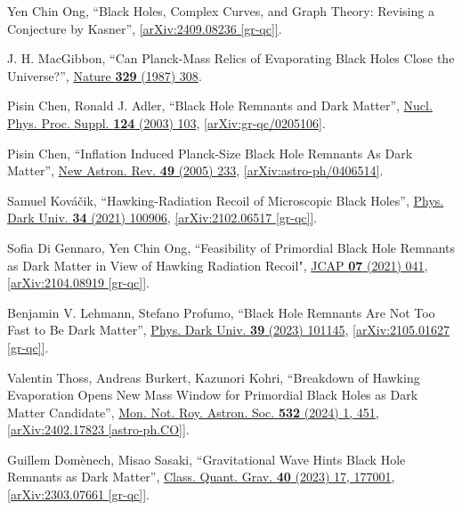 \documentclass[preprintnumbers, floatfix, preprintnumbers, letterpaper, twocolumn, superscriptaddress,nofootinbib]{revtex4-2}
\begin{document}
\begin{thebibliography}{99}
Yen Chin Ong, ``Black Holes, Complex Curves, and Graph Theory: Revising a Conjecture by Kasner'', \href{https://arxiv.org/abs/2409.08236}{[arXiv:2409.08236 [gr-qc]]}.

J. H. MacGibbon, ``Can Planck-Mass Relics of Evaporating Black Holes Close the Universe?'', {\hypersetup{urlcolor=vividviolet}\href{https://www.nature.com/articles/329308a0}{Nature \textbf{329} (1987) 308}}.

Pisin Chen, Ronald J. Adler, ``Black Hole Remnants and Dark Matter'', {\hypersetup{urlcolor=vividviolet}\href{https://www.sciencedirect.com/science/article/abs/pii/S0920563203020887?via\%3Dihub}{Nucl. Phys. Proc. Suppl. \textbf{124} (2003) 103}}, \href{https://arxiv.org/abs/gr-qc/0205106}{[arXiv:gr-qc/0205106]}.

Pisin Chen, ``Inflation Induced Planck-Size Black Hole Remnants As Dark Matter'', {\hypersetup{urlcolor=vividviolet}\href{https://www.sciencedirect.com/science/article/abs/pii/S1387647305000333?via\%3Dihub}{New Astron. Rev. \textbf{49} (2005) 233}}, \href{https://arxiv.org/abs/astro-ph/0406514}{[arXiv:astro-ph/0406514]}.

Samuel Kováčik, ``Hawking-Radiation Recoil of Microscopic Black Holes'', {\hypersetup{urlcolor=vividviolet}\href{https://www.sciencedirect.com/science/article/abs/pii/S2212686421001333?via\%3Dihub}{Phys. Dark Univ. \textbf{34} (2021) 100906}}, \href{https://arxiv.org/abs/2102.06517}{[arXiv:2102.06517 [gr-qc]]}.

Sofia Di Gennaro, Yen Chin Ong, ``Feasibility of Primordial Black Hole Remnants as Dark Matter in View of Hawking Radiation Recoil",  {\hypersetup{urlcolor=vividviolet}\href{https://iopscience.iop.org/article/10.1088/1475-7516/2021/07/041}{JCAP \textbf{07} (2021) 041}}, \href{https://arxiv.org/abs/2104.08919}{[arXiv:2104.08919 [gr-qc]]}.

Benjamin V. Lehmann, Stefano Profumo, ``Black Hole Remnants Are Not Too Fast to Be Dark Matter'', {\hypersetup{urlcolor=vividviolet}\href{https://www.sciencedirect.com/science/article/pii/S2212686422001182?via\%3Dihub}{Phys. Dark Univ. \textbf{39} (2023) 101145}}, \href{https://arxiv.org/abs/2105.01627}{[arXiv:2105.01627 [gr-qc]]}.

Valentin Thoss, Andreas Burkert, Kazunori Kohri, ``Breakdown of Hawking Evaporation Opens New Mass Window for Primordial Black Holes as Dark Matter Candidate'', {\hypersetup{urlcolor=vividviolet}\href{https://academic.oup.com/mnras/article/532/1/451/7656972}{Mon. Not. Roy. Astron. Soc. \textbf{532} (2024) 1, 451}}, \href{https://arxiv.org/abs/2402.17823}{[arXiv:2402.17823 [astro-ph.CO]]}.

Guillem Domènech, Misao Sasaki, ``Gravitational Wave Hints Black Hole Remnants as Dark Matter'',  {\hypersetup{urlcolor=vividviolet}\href{https://iopscience.iop.org/article/10.1088/1361-6382/ace493}{Class. Quant. Grav. \textbf{40} (2023) 17, 177001}}, \href{https://arxiv.org/abs/2303.07661}{[arXiv:2303.07661 [gr-qc]]}.

\end{thebibliography}
\end{document}
